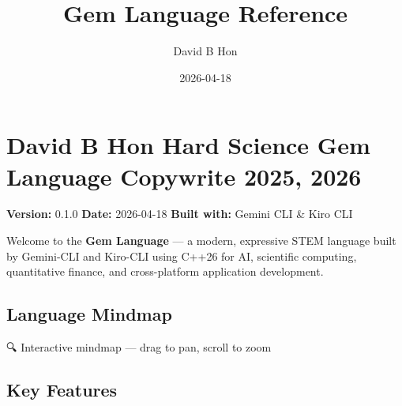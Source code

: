 \documentclass[
]{article}
\title{Gem Language Reference}
\author{David B Hon}
\date{2026-04-18}
\begin{document}
\maketitle

\section{David B Hon Hard Science Gem Language Copywrite 2025,
2026}\label{david-b-hon-hard-science-gem-language-copywrite-2025-2026}

\textbf{Version:} 0.1.0 \textbar{} \textbf{Date:} 2026-04-18 \textbar{}
\textbf{Built with:} Gemini CLI \& Kiro CLI

Welcome to the \textbf{Gem Language} --- a modern, expressive STEM
language built by Gemini-CLI and Kiro-CLI using C++26 for AI, scientific
computing, quantitative finance, and cross-platform application
development.

\subsection{Language Mindmap}\label{language-mindmap}

🔍 Interactive mindmap --- drag to pan, scroll to zoom

\subsection{Key Features}\label{key-features}
\end{document}

